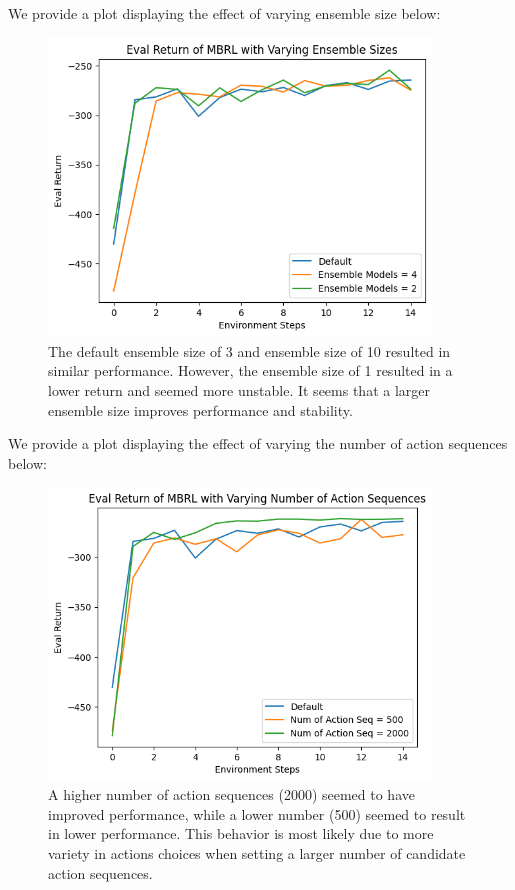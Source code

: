 \documentclass{article} %
\begin{document}
\begin{sol}
  We provide a plot displaying the effect of varying ensemble size below:
  \begin{figure}[ht!]
    \color{darkblue}
  \begin{center}
    \includegraphics[width=4in]{images/q4/ensemble.png}
  \end{center}
  \caption{The default ensemble size of 3 and ensemble size of 10 resulted in similar performance. However, the ensemble size of 1 resulted in a lower return and seemed more unstable. It seems that a larger ensemble size improves performance and stability.}
  \end{figure}

  \newpage
  We provide a plot displaying the effect of varying the number of action sequences below:
  \begin{figure}[ht!]
    \color{darkblue}
  \begin{center}
    \includegraphics[width=4in]{images/q4/acseqs.png}
  \end{center}
  \caption{A higher number of action sequences (2000) seemed to have improved performance, while a lower number (500) seemed to result in lower performance. This behavior is most likely due to more variety in actions choices when setting a larger number of candidate action sequences.}
\end{figure}


\end{sol}
\end{document}
